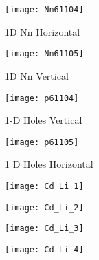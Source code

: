 \begin{landscape}
\begin{figure}[!htp]
\centering
\texttt{[image: Nn61104]}
\caption{1D Nn Horizontal} 
\end{figure}
\end{landscape}

\begin{landscape}
\begin{figure}[!htp]
\centering
\texttt{[image: Nn61105]}
\caption{1D Nn Vertical} 
\end{figure}
\end{landscape}

\begin{landscape}
\begin{figure}[!htp]
\centering
\texttt{[image: p61104]}
\caption{1-D Holes Vertical} 
\end{figure}
\end{landscape}

\begin{landscape}
\begin{figure}[!htp]
\centering
\texttt{[image: p61105]}
\caption{1 D Holes Horizontal} 
\end{figure}
\end{landscape}



\begin{figure}[!htp]
\centering
\texttt{[image: Cd\_Li\_1]}
\caption{} 
\end{figure}

\begin{figure}[!htp]
\centering
\texttt{[image: Cd\_Li\_2]}
\caption{} 
\end{figure}

\begin{figure}[!htp]
\centering
\texttt{[image: Cd\_Li\_3]}
\caption{} 
\end{figure}


\begin{figure}[!htp]
\centering
\texttt{[image: Cd\_Li\_4]}
\caption{} 
\end{figure}